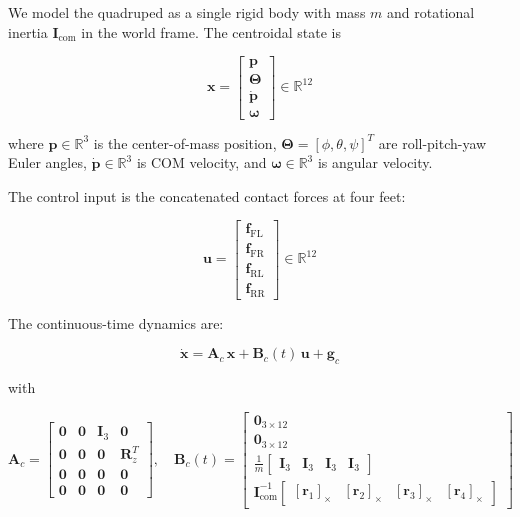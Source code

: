 \documentclass[11pt,a4paper]{article}
\begin{document}
We model the quadruped as a single rigid body with mass $m$ and rotational inertia $\mathbf{I}_{\text{com}}$ in the world frame. The centroidal state is

\begin{equation}
\mathbf{x} = \begin{bmatrix} \mathbf{p} \\ \boldsymbol{\Theta} \\ \dot{\mathbf{p}} \\ \boldsymbol{\omega} \end{bmatrix} \in \mathbb{R}^{12}
\end{equation}

where $\mathbf{p} \in \mathbb{R}^3$ is the center-of-mass position, $\boldsymbol{\Theta} = [\phi, \theta, \psi]^T$ are roll-pitch-yaw Euler angles, $\dot{\mathbf{p}} \in \mathbb{R}^3$ is COM velocity, and $\boldsymbol{\omega} \in \mathbb{R}^3$ is angular velocity.

The control input is the concatenated contact forces at four feet:

\begin{equation}
\mathbf{u} = \begin{bmatrix} \mathbf{f}_{\text{FL}} \\ \mathbf{f}_{\text{FR}} \\ \mathbf{f}_{\text{RL}} \\ \mathbf{f}_{\text{RR}} \end{bmatrix} \in \mathbb{R}^{12}
\end{equation}

The continuous-time dynamics are:

\begin{equation}
\dot{\mathbf{x}} = \mathbf{A}_c\,\mathbf{x} + \mathbf{B}_c(t)\,\mathbf{u} + \mathbf{g}_c
\end{equation}

with

\begin{equation}
\mathbf{A}_c = \begin{bmatrix} \mathbf{0} & \mathbf{0} & \mathbf{I}_3 & \mathbf{0} \\ \mathbf{0} & \mathbf{0} & \mathbf{0} & \mathbf{R}_z^T \\ \mathbf{0} & \mathbf{0} & \mathbf{0} & \mathbf{0} \\ \mathbf{0} & \mathbf{0} & \mathbf{0} & \mathbf{0} \end{bmatrix}, \quad \mathbf{B}_c(t) = \begin{bmatrix} \mathbf{0}_{3 \times 12} \\ \mathbf{0}_{3 \times 12} \\ \frac{1}{m}\begin{bmatrix}\mathbf{I}_3 & \mathbf{I}_3 & \mathbf{I}_3 & \mathbf{I}_3\end{bmatrix} \\ \mathbf{I}_{\text{com}}^{-1}\begin{bmatrix}[\mathbf{r}_1]_\times & [\mathbf{r}_2]_\times & [\mathbf{r}_3]_\times & [\mathbf{r}_4]_\times\end{bmatrix} \end{bmatrix}
\end{equation}
\end{document}
